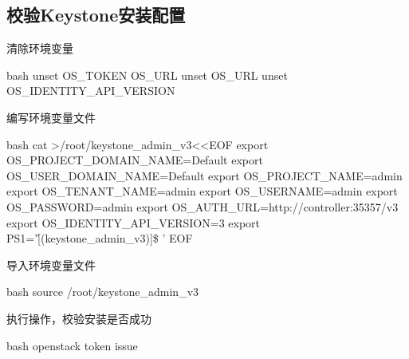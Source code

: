 \subsection{校验Keystone安装配置}

清除环境变量

\begin{code-block}{bash}
unset OS_TOKEN OS_URL
unset OS_URL
unset OS_IDENTITY_API_VERSION
\end{code-block}

编写环境变量文件

\begin{code-block}{bash}
cat >/root/keystone_admin_v3<<EOF
export OS_PROJECT_DOMAIN_NAME=Default
export OS_USER_DOMAIN_NAME=Default
export OS_PROJECT_NAME=admin
export OS_TENANT_NAME=admin
export OS_USERNAME=admin
export OS_PASSWORD=admin
export OS_AUTH_URL=http://controller:35357/v3
export OS_IDENTITY_API_VERSION=3
export PS1='[\u@\h \W(keystone_admin_v3)]\$ '
EOF
\end{code-block}

导入环境变量文件

\begin{code-block}{bash}
source /root/keystone_admin_v3
\end{code-block}

执行操作，校验安装是否成功

\begin{code-block}{bash}
openstack token issue
\end{code-block}